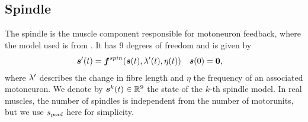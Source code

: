 \subsection{Spindle}
The spindle is the muscle component responsible for motoneuron feedback, where the model used is from \cite{Mileusnic2006}.
It has $9$ degrees of freedom and is given by
\begin{align}
	\boldsymbol{s}'(t) &= \boldsymbol{f}^{spin}(\boldsymbol{s}(t),\lambda'(t),\eta(t)) & \boldsymbol{s}(0) &= \boldsymbol{0},\label{def:spindlesys}
\end{align}
where $\lambda'$ describes the change in fibre length and $\eta$ the frequency of an associated motoneuron.
We denote by $\boldsymbol{s}^k(t)\in\mathbb{R}^9$ the state of the $k$-th spindle model. In real muscles, the number of spindles is independent from the
number of motorunits, but we use ${s_{pool}}$ here for simplicity.

